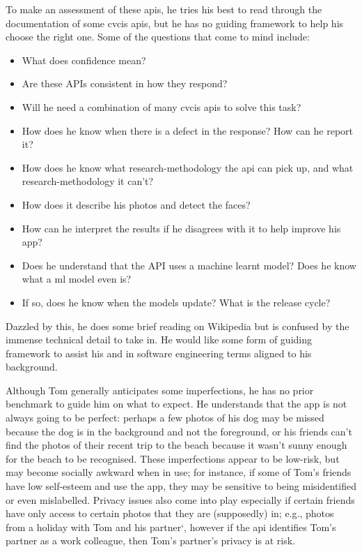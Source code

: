

To make an assessment of these \glspl{api}, he tries his best to read through the documentation of some \gls{cvcis} \glspl{api}, but he has no guiding framework to help his choose the right one. Some of the questions that come to mind include:

\begin{itemize}
  \item What does confidence mean? 
  \item Are these APIs consistent in how they respond?
  \item Will he need a combination of many \gls{cvcis} \glspl{api} to solve this task?
  \item How does he know when there is a defect in the response? How can he report it?
  \item How does he know what research-methodology the \gls{api} can pick up, and what research-methodology it can't?
  \item How does it describe his photos and detect the faces?
  \item How can he interpret the results if he disagrees with it to help improve his app?
  \item Does he understand that the API uses a machine learnt model? Does he know what a \gls{ml} model even is?
  \item If so, does he know when the models update? What is the release cycle?
\end{itemize}

Dazzled by this, he does some brief reading on Wikipedia but is confused by the immense technical detail to take in. He would like some form of guiding framework to assist his and in software engineering terms aligned to his background.

Although Tom generally anticipates some imperfections, he has no prior benchmark to guide him on what to expect. He understands that the app is not always going to be perfect: perhaps a few photos of his dog may be missed because the dog is in the background and not the foreground, or his friends can't find the photos of their recent trip to the beach because it wasn't sunny enough for the beach to be recognised. These imperfections appear to be low-risk, but may become socially awkward when in use; for instance, if some of Tom's friends have low self-esteem and use the app, they may be sensitive to being misidentified or even mislabelled. Privacy issues also come into play especially if certain friends have only access to certain photos that they are (supposedly) in; e.g., photos from a holiday with Tom and his partner`, however if the \gls{api} identifies Tom's partner as a work colleague, then Tom's partner's privacy is at risk.

